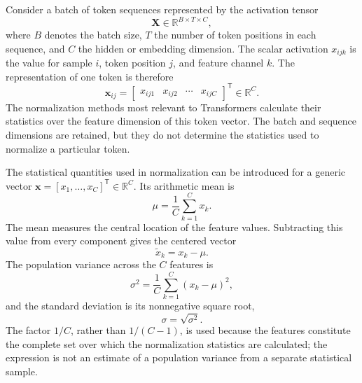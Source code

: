 Consider a batch of token sequences represented by the activation tensor
\begin{equation}
    \mathbf{X}\in\mathbb{R}^{B\times T\times C},
    \label{eq:norm-input-tensor}
\end{equation}
where \(B\) denotes the batch size, \(T\) the number of token positions in
each sequence, and \(C\) the hidden or embedding dimension. The scalar
activation \(x_{ijk}\) is the value for sample \(i\), token position \(j\),
and feature channel \(k\). The representation of one token is therefore
\begin{equation}
    \mathbf{x}_{ij}
    =
    \begin{bmatrix}
        x_{ij1} & x_{ij2} & \cdots & x_{ijC}
    \end{bmatrix}^{\mathsf T}
    \in\mathbb{R}^{C}.
    \label{eq:norm-token-vector}
\end{equation}
The normalization methods most relevant to Transformers calculate their
statistics over the feature dimension of this token vector. The batch and
sequence dimensions are retained, but they do not determine the statistics
used to normalize a particular token.

The statistical quantities used in normalization can be introduced for a
generic vector
\(\mathbf{x}=[x_1,\ldots,x_C]^{\mathsf T}\in\mathbb{R}^{C}\).
Its arithmetic mean is
\begin{equation}
    \mu
    =
    \frac{1}{C}\sum_{k=1}^{C}x_k.
    \label{eq:norm-mean}
\end{equation}
The mean measures the central location of the feature values. Subtracting
this value from every component gives the centered vector
\begin{equation}
    \widetilde{x}_k=x_k-\mu.
    \label{eq:norm-centered-value}
\end{equation}
The population variance across the \(C\) features is
\begin{equation}
    \sigma^2
    =
    \frac{1}{C}\sum_{k=1}^{C}(x_k-\mu)^2,
    \label{eq:norm-variance}
\end{equation}
and the standard deviation is its nonnegative square root,
\begin{equation}
    \sigma=\sqrt{\sigma^2}.
    \label{eq:norm-standard-deviation}
\end{equation}
The factor \(1/C\), rather than \(1/(C-1)\), is used because the features
constitute the complete set over which the normalization statistics are
calculated; the expression is not an estimate of a population variance from
a separate statistical sample.

